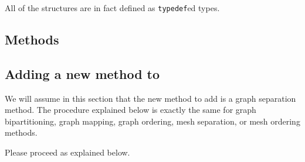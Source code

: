 All of the structures are in fact defined as {\tt typedef}ed types.

\subsection{Methods}

\subsection{Adding a new method to \scotch}

We will assume in this section that the new method to add is a graph
separation method. The procedure explained below is exactly the same
for graph bipartitioning, graph mapping, graph ordering, mesh
separation, or mesh ordering methods.

Please proceed as explained below.
